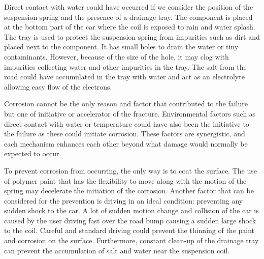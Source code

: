 \documentclass[11pt]{article}
\begin{document}
Direct contact with water could have occurred if we consider the position of the suspension spring and the presence of a drainage tray. The component is placed at the bottom part of the car where the coil is exposed to rain and water splash. The tray is used to protect the suspension spring from impurities such as dirt and placed next to the component. It has small holes to drain the water or tiny contaminants. However, because of the size of the hole, it may clog with impurities collecting water and other impurities in the tray. The salt from the road could have accumulated in the tray with water and act as an electrolyte allowing easy flow of the electrons.  
 
Corrosion cannot be the only reason and factor that contributed to the failure but one of initiative or accelerator of the fracture. Environmental factors such as direct contact with water or temperature could have also been the initiative to the failure as these could initiate corrosion. These factors are synergistic, and each mechanism enhances each other beyond what damage would normally be expected to occur. 
 
To prevent corrosion from occurring, the only way is to coat the surface. The use of polymer paint that has the flexibility to move along with the motion of the spring may decelerate the initiation of the corrosion. Another factor that can be considered for the prevention is driving in an ideal condition: preventing any sudden shock to the car. A lot of sudden motion change and collision of the car is caused by the user driving fast over the road bump causing a sudden large shock to the coil. Careful and standard driving could prevent the thinning of the paint and corrosion on the surface. Furthermore, constant clean-up of the drainage tray can prevent the accumulation of salt and water near the suspension coil. 
\end{document}
